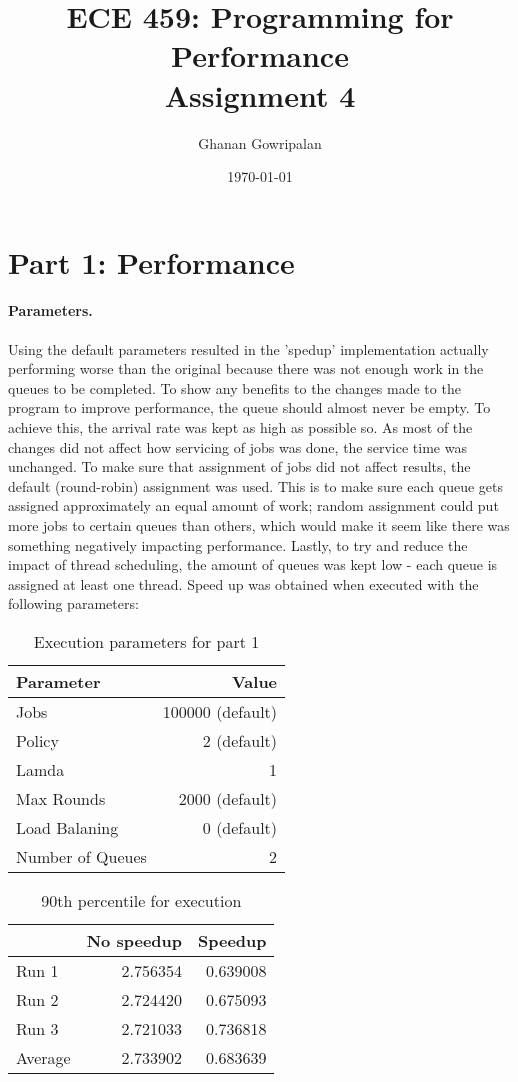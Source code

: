 \documentclass[12pt]{article}
\title{ECE 459: Programming for Performance\\Assignment 4}
\author{Ghanan Gowripalan}
\date{\today}
\begin{document}
\maketitle

\newpage
\section*{Part 1: Performance}

\paragraph{Parameters.} Using the default parameters resulted in the 'spedup' implementation actually performing worse than the original because there was not enough work in the queues to be completed. To show any benefits to the changes made to the program to improve performance, the queue should almost never be empty. To achieve this, the arrival rate was kept as high as possible so. As most of the changes did not affect how servicing of jobs was done, the service time was unchanged. To make sure that assignment of jobs did not affect results, the default (round-robin) assignment was used. This is to make sure each queue gets assigned approximately an equal amount of work; random assignment could put more jobs to certain queues than others, which would make it seem like there was something negatively impacting performance. Lastly, to try and reduce the impact of thread scheduling, the amount of queues was kept low - each queue is assigned at least one thread. Speed up was obtained when executed with the following parameters:

\begin{table}[H]
  \centering
  \begin{tabular}{lr}
    {\bf Parameter} & {\bf Value} \\
    \hline
    Jobs & 100000 (default) \\
    Policy & 2 (default) \\
    Lamda & 1 \\
    Max Rounds & 2000 (default) \\
    Load Balaning & 0 (default) \\
    Number of Queues & 2 \\
  \end{tabular}
  \caption{Execution parameters for part 1}
  \label{tbl-part1-params}
\end{table}

\begin{table}[H]
  \centering
  \begin{tabular}{lrr}
    & {\bf No speedup} & {\bf Speedup} \\
    \hline
    Run 1 & 2.756354 & 0.639008 \\
    Run 2 & 2.724420 & 0.675093 \\
    Run 3 & 2.721033 & 0.736818 \\
    \hline
    Average & 2.733902 & 0.683639 \\
  \end{tabular}
  \caption{90th percentile for execution}
  \label{tbl-part1-90th-percentile}
\end{table}
\end{document}
